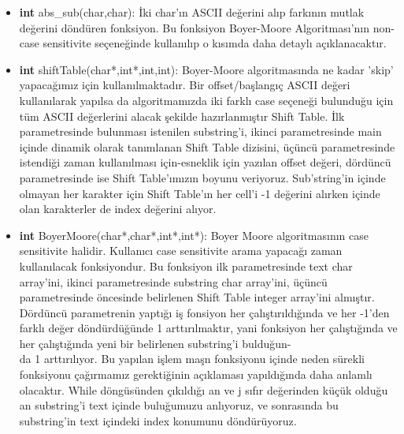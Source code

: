 \documentclass[11pt]{article}
\begin{document}
\begin{itemize}
	\item \textbf{int} \textsf{abs\_sub(char,char):} İki char'ın ASCII
	değerini alıp farkının mutlak değerini döndüren fonksiyon. Bu fonksiyon
	Boyer-Moore Algoritması'nın non-case sensitivite seçeneğinde kullanılıp
	o kısımda daha detaylı açıklanacaktır.
	
	\item \textbf{int} \textsf{shiftTable(char*,int*,int,int):} Boyer-Moore
	algoritmasında ne kadar 'skip' yapacağımız için kullanılmaktadır. Bir
	offset/başlangıç ASCII değeri kullanılarak yapılsa da algoritmamızda
	iki farklı case seçeneği bulunduğu için tüm ASCII değerlerini alacak 
	şekilde hazırlanmıştır Shift Table. İlk parametresinde bulunması 
	istenilen sub\-string'i, ikinci parametresinde main içinde dinamik olarak
	tanımlanan Shift Table dizisini, üçüncü parametresinde istendiği zaman 
	kullanılması için-esneklik için yazılan offset değeri, dördüncü 
	parametresinde ise Shift Table'ımızın boyunu veriyoruz. Sub'string'in
	içinde olmayan her karakter için Shift Table'ın her cell'i -1 değerini
	alırken içinde olan karakterler de index değerini alıyor. 
	
	\item \textbf{int} \textsf{BoyerMoore(char*,char*,int*,int*):} Boyer 
	Moore algoritmasının case sensitivite halidir. Kullanıcı case sensitivite 
	arama yapacağı zaman kullanılacak fonksiyondur. Bu fonksiyon ilk 
	parametresinde text char array'ini, ikinci parametresinde
	substring char array'ini, üçüncü parametresinde öncesinde belirlenen
	Shift Table integer array'ini almıştır. Dördüncü parametrenin yaptığı iş
	fonsiyon her çalıştırıldığında ve her -1'den farklı değer döndürdüğünde
	1 arttırılmaktır, yani fonksiyon her çalıştığında ve her çalıştığında 
	yeni bir belirlenen substring'i bulduğun-\\da 1 arttırılıyor. Bu yapılan
	işlem maşn fonksiyonu içinde neden sürekli fonksiyonu çağırmamız 
	gerektiğinin açıklaması yapıldığında daha anlamlı olacaktır. While 
	döngüsünden çıkıldığı an ve j sıfır değerinden küçük olduğu an 
	substring'i text içinde buluğumuzu anlıyoruz, ve sonrasında bu 
	substring'in text içindeki index konumunu döndürüyoruz.
	

\end{itemize}
\end{document}
